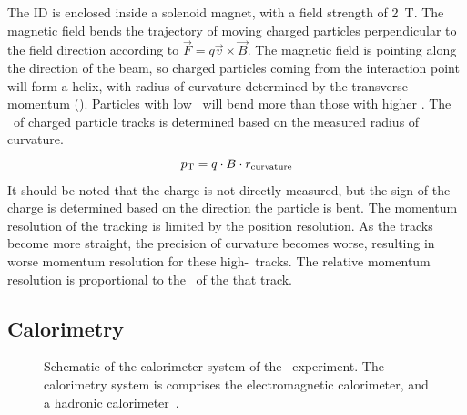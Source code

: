 The ID is enclosed inside a solenoid magnet, with a field strength of 2~T.
The magnetic field bends the trajectory of moving charged particles
perpendicular to the field direction according to
$\vec{F} = q \vec{v}\times \vec{B}$.
The magnetic field is pointing along the direction of the beam, so charged
particles coming from the interaction point will form a helix, with radius
of curvature determined by the transverse momentum (\pt).
Particles with low \pt\ will bend more than those with higher \pt.
The \pt\ of charged particle tracks is determined based on the measured radius
of curvature.
\begin{equation}
  p_{\mathrm{T}} = q \cdot B \cdot r_\mathrm{curvature}
\end{equation}
It should be noted that the charge is not directly measured, but the sign of
the charge is determined based on the direction the particle is bent.
The momentum resolution of the tracking is limited by the position resolution.
As the tracks become more straight, the precision of curvature becomes worse,
resulting in worse momentum resolution for these high-\pt\ tracks.
The relative momentum resolution is proportional to the \pt\ of the that track.

\FloatBarrier
\subsection{Calorimetry} 
\label{sec:calo}

\begin{figure}[ht]
  \caption[
    Schematic of the calorimeter system of the
    \atlas\ experiment~\cite{cern-jinst-atlas}.
  ]{
    Schematic of the calorimeter system of the
    \atlas\ experiment.
    The calorimetry system is comprises the electromagnetic calorimeter,
    and a hadronic calorimeter~\cite{cern-jinst-atlas}.
  }
  \label{fig:calo_cartoon}
\end{figure}

